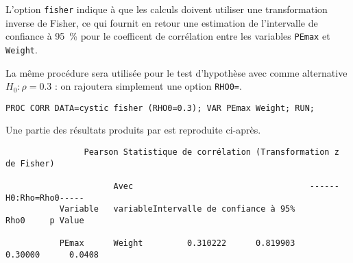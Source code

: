 L'option \texttt{fisher} indique à \SAS que les calculs doivent utiliser une
transformation inverse de Fisher, ce qui fournit en retour une estimation de
l'intervalle de confiance à 95~\% pour le coefficent de corrélation entre
les variables \texttt{PEmax} et \texttt{Weight}.

La même procédure sera utilisée pour le test d'hypothèse avec comme
alternative $H_0: \rho=0.3$ : on rajoutera simplement une option
\texttt{RHO0=}.
\begin{verbatim}
PROC CORR DATA=cystic fisher (RHO0=0.3); VAR PEmax Weight; RUN;
\end{verbatim}
Une partie des résultats produits par \SAS est reproduite ci-après.
\begin{verbatim}
                Pearson Statistique de corrélation (Transformation z de Fisher)

                      Avec                                    ------H0:Rho=Rho0-----
           Variable   variableIntervalle de confiance à 95%         Rho0     p Value

           PEmax      Weight         0.310222      0.819903      0.30000      0.0408
\end{verbatim}


